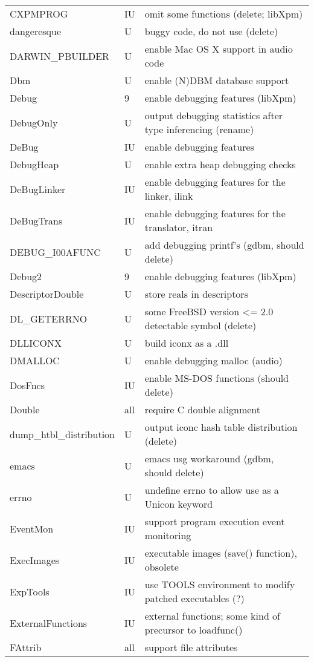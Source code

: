 \begin{xtabular}{|m{1.8in}|m{0.5in}|m{4.0in}|}
CXPMPROG & IU & omit some functions (delete; libXpm) \\
dangeresque & U & buggy code, do not use (delete) \\
DARWIN\_PBUILDER & U & enable Mac OS X support in audio code \\
Dbm & U & enable (N)DBM database support \\
Debug & 9 & enable debugging features (libXpm) \\
DebugOnly & U & output debugging statistics after type inferencing (rename) \\
DeBug & IU & enable debugging features \\
DebugHeap & U & enable extra heap debugging checks \\
DeBugLinker & IU & enable debugging features for the linker, ilink \\
DeBugTrans & IU & enable debugging features for the translator, itran \\
DEBUG\_I00AFUNC & U & add debugging printf's (gdbm, should delete) \\
Debug2 & 9 & enable debugging features (libXpm) \\
DescriptorDouble & U & store reals in descriptors \\
DL\_GETERRNO & U & some FreeBSD version <= 2.0 detectable symbol (delete) \\
DLLICONX & U & build iconx as a .dll \\
DMALLOC & U & enable debugging malloc (audio) \\
DosFncs & IU & enable MS-DOS functions (should delete) \\
Double & all & require C double alignment \\
dump\_htbl\_distribution & U & output iconc hash table distribution (delete) \\
emacs & U & emacs usg workaround (gdbm, should delete) \\
errno & U & undefine errno to allow use as a Unicon keyword \\
EventMon & IU & support program execution event monitoring \\
ExecImages & IU & executable images (save() function), obsolete \\
ExpTools & IU & use TOOLS environment to modify patched executables (?) \\
ExternalFunctions & IU & external functions; some kind of precursor to loadfunc() \\
FAttrib & all & support file attributes \\

\end{xtabular}
